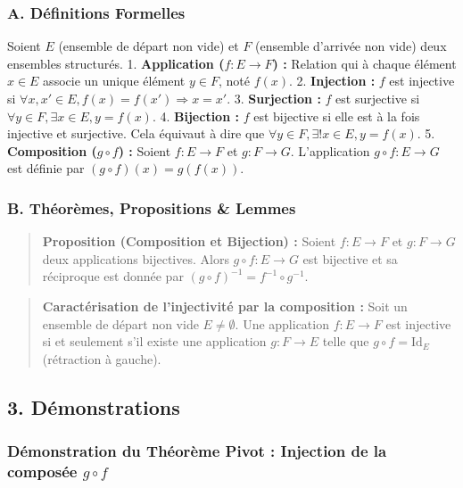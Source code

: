 \documentclass[12pt,a4paper]{report}
\begin{document}
\subsubsection{A. Définitions
Formelles}\label{a.-duxe9finitions-formelles}

Soient \(E\) (ensemble de départ non vide) et \(F\) (ensemble d'arrivée
non vide) deux ensembles structurés. 1. \textbf{Application
(\(f : E \to F\)) :} Relation qui à chaque élément \(x \in E\) associe
un unique élément \(y \in F\), noté \(f(x)\). 2. \textbf{Injection :}
\(f\) est injective si
\(\forall x, x' \in E, f(x) = f(x') \Rightarrow x = x'\). 3.
\textbf{Surjection :} \(f\) est surjective si
\(\forall y \in F, \exists x \in E, y = f(x)\). 4. \textbf{Bijection :}
\(f\) est bijective si elle est à la fois injective et surjective. Cela
équivaut à dire que \(\forall y \in F, \exists ! x \in E, y = f(x)\). 5.
\textbf{Composition (\(g \circ f\)) :} Soient \(f : E \to F\) et
\(g : F \to G\). L'application \(g \circ f : E \to G\) est définie par
\((g \circ f)(x) = g(f(x))\).

\subsubsection{B. Théorèmes, Propositions \&
Lemmes}\label{b.-thuxe9oruxe8mes-propositions-lemmes}

\begin{quote}
\textbf{Proposition (Composition et Bijection) :} Soient \(f : E \to F\)
et \(g : F \to G\) deux applications bijectives. Alors
\(g \circ f : E \to G\) est bijective et sa réciproque est donnée par
\((g \circ f)^{-1} = f^{-1} \circ g^{-1}\).
\end{quote}

\begin{quote}
\textbf{Caractérisation de l'injectivité par la composition :} Soit un
ensemble de départ non vide \(E \neq \emptyset\). Une application
\(f : E \to F\) est injective si et seulement s'il existe une
application \(g : F \to E\) telle que \(g \circ f = \text{Id}_E\)
(rétraction à gauche).
\end{quote}

\subsection{3. Démonstrations}\label{duxe9monstrations}

\subsubsection{\texorpdfstring{Démonstration du Théorème Pivot :
Injection de la composée
\(g \circ f\)}{Démonstration du Théorème Pivot : Injection de la composée g \textbackslash circ f}}\label{duxe9monstration-du-thuxe9oruxe8me-pivot-injection-de-la-composuxe9e-g-circ-f}
\end{document}
